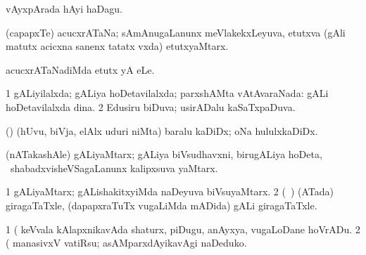 \bentry
{}
\gl{\nA}
\bmng
vAyxpArada hAyi haDagu. 
\emng
\eentry

\bentry
{} 
\gl{\nA}
\expl{}
\bmng
(capapxTe) acucxrATaNa; sAmAnugaLanunx meVlakekxLeyuva, etutxva (gAli matutx acicxna sanenx tatatx vxda) etutxyaMtarx. 
\emng
\eentry

\bentry
{}
\pron{}
\gl{\sakirx}
\bmng
acucxrATaNadiMda etutx yA eLe. 
\emng
\eentry

\bentry
{} 
\gl{\gu}
\expl{}
\bmng
\bnum
\num{1} gALiyilalxda; gALiya hoDetavilalxda; parxshAMta vAtAvaraNada:  gALi hoDetavilalxda dina. 
\num{2} Edusiru biDuva; usirADalu kaSaTxpaDuva. 
\enum
\emng
\eentry

\bentry
{}
\gl{\nA}
\bmng
(\pArxparx) (hUvu, biVja, elAlx uduri niMta) baralu kaDiDx; oNa hululxkaDiDx. 
\emng
\eentry

\bentry
{}
\gl{\nA}
\bmng
(nATakashAle) gALiyaMtarx; gALiya biVsudhavxni, birugALiya hoDeta, \mo\ shabadxvisheVSagaLanunx kalipxsuva yaMtarx. 
\emng
\eentry

\bentry
{} 
\gl{\nA}
\expl{}
\bmng
\bnum
\num{1} gALiyaMtarx; gALishakitxyiMda naDeyuva biVsuyaMtarx. 
\num{2} (\kanmu\ \birx) (ATada) giragaTaTxle, (dapapxraTuTx \mo vugaLiMda mADida) gALi giragaTaTxle. 
\enum
\emng

\noindent 
\gl{\pagu}
\expl{}
\bmng
\bnum
\num{1}  (  keVvala kAlapxnikavAda shaturx, piDugu, anAyxya, \mo vugaLoDane hoVrADu. 
\num{2}  (  manasivxV vatiRsu; asAMparxdAyikavAgi naDeduko. 
\enum
\emng
\eentry

